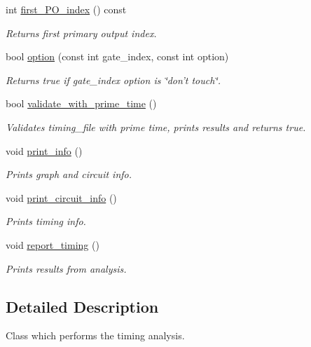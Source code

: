 \begin{DoxyCompactItemize}
\item 
int \hyperlink{classTiming__Analysis_1_1Timing__Analysis_a5c2fd4b82fa80ea43fa1f519b230c8fe}{first\-\_\-\-P\-O\-\_\-index} () const 
\begin{DoxyCompactList}\small\item\em Returns first primary output index. \end{DoxyCompactList}\item 
bool \hyperlink{classTiming__Analysis_1_1Timing__Analysis_ad5d0274622ee3f7d2c2f3d731b35ac9a}{option} (const int gate\-\_\-index, const int option)
\begin{DoxyCompactList}\small\item\em Returns true if gate\-\_\-index option is \char`\"{}don't touch\char`\"{}. \end{DoxyCompactList}\item 
bool \hyperlink{classTiming__Analysis_1_1Timing__Analysis_aa4220574cd239b38b7905636a6a4e43b}{validate\-\_\-with\-\_\-prime\-\_\-time} ()
\begin{DoxyCompactList}\small\item\em Validates timing\-\_\-file with prime time, prints results and returns true. \end{DoxyCompactList}\item 
void \hyperlink{classTiming__Analysis_1_1Timing__Analysis_ad88fd0b79ae6d221a5691da10b0aa9e4}{print\-\_\-info} ()
\begin{DoxyCompactList}\small\item\em Prints graph and circuit info. \end{DoxyCompactList}\item 
void \hyperlink{classTiming__Analysis_1_1Timing__Analysis_a2c45b5a9fd71b7197a327593d54663a3}{print\-\_\-circuit\-\_\-info} ()
\begin{DoxyCompactList}\small\item\em Prints timing info. \end{DoxyCompactList}\item 
void \hyperlink{classTiming__Analysis_1_1Timing__Analysis_a6d3fd296c18a72b05d36addc14068e16}{report\-\_\-timing} ()
\begin{DoxyCompactList}\small\item\em Prints results from analysis. \end{DoxyCompactList}\end{DoxyCompactItemize}


\subsection{Detailed Description}
Class which performs the timing analysis. 


